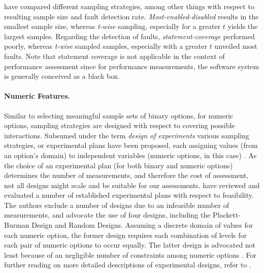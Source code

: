 \cite{medeiros_comparison_2016} have compared different sampling strategies,
among other things with respect to resulting sample size and fault detection
rate. \emph{Most-enabled-disabled} results in the smallest
sample size, whereas \emph{t-wise} sampling, especially for a greater $t$ yields
the largest samples. Regarding the detection of faults,
\emph{statement-coverage} performed poorly, whereas \emph{t-wise} sampled
samples, especially with a greater $t$ unveiled most faults. Note that statement
coverage is not applicable in the context of performance assessment since for
performance measurements, the software system is generally conceived as a  black
box. 

\paragraph{Numeric Features.}
Similar to selecting meaningful sample sets of binary options, for numeric
options, sampling strategies are designed with respect to covering possible
interactions. Subsumed under the term \emph{design of experiments} various
sampling strategies, or experimental plans have been proposed, each assigning values
(from an option’s domain) to independent variables (numeric options, in this
case) \citep{antony_design_2014}. As the choice of an experimental plan (for
both binary and numeric options) determines the number of measurements, and therefore the cost of
assessment, not all designs might scale and be suitable for our assessments.
\cite{siegmund_performance-influence_2015} have reviewed and evaluated a number
of established experimental plans with respect to feasibility. The authors exclude a number of
designs due to an infeasible number of measurements, and advocate the use of
four designs, including the Plackett-Burman Design and Random Designs. Assuming
a discrete domain of values for each numeric option, the former design requires
each combination of levels for each pair of numeric options to occur equally.
The latter design is advocated not least because of an negligible number of
constraints among numeric options \citep{siegmund_performance-influence_2015}.
For further reading on more detailed descriptions of experimental designs, refer
to \cite{antony_design_2014}. 

